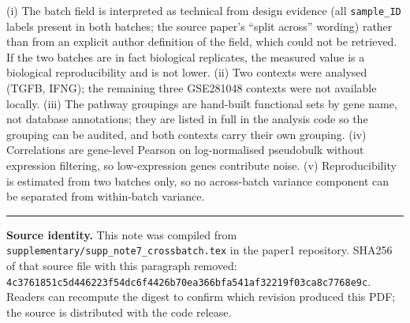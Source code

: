\documentclass[11pt,a4paper]{article}
\begin{document}
(i) The batch field is interpreted as technical from design evidence (all \texttt{sample\_ID}
labels present in both batches; the source paper's ``split across'' wording) rather than from an
explicit author definition of the field, which could not be retrieved. If the two batches are in
fact biological replicates, the measured value is a biological reproducibility and is not lower.
(ii) Two contexts were analysed (TGFB, IFNG); the remaining three GSE281048 contexts were not
available locally.
(iii) The pathway groupings are hand-built functional sets by gene name, not database annotations;
they are listed in full in the analysis code so the grouping can be audited, and both contexts
carry their own grouping.
(iv) Correlations are gene-level Pearson on log-normalised pseudobulk without expression
filtering, so low-expression genes contribute noise.
(v) Reproducibility is estimated from two batches only, so no across-batch variance component can
be separated from within-batch variance.

\vspace{10pt}
\noindent\rule{\textwidth}{0.4pt}
\footnotesize\textbf{Source identity.} This note was compiled from \texttt{supplementary/supp\_note7\_crossbatch.tex} in the paper1 repository. SHA256 of that source file with this paragraph removed: \texttt{4c3761851c5d446223f54dc6f4426b70ea366bfa541af32219f03ca8c7768e9c}. Readers can recompute the digest to confirm which revision produced this PDF; the source is distributed with the code release.
\end{document}
